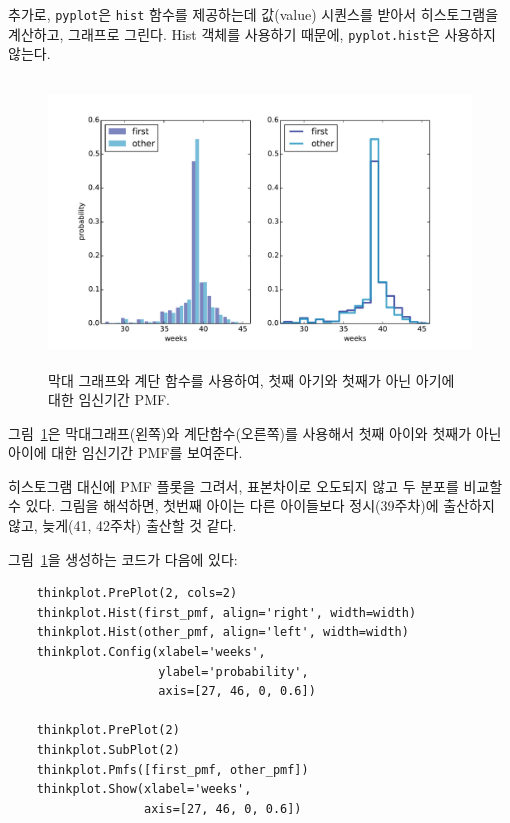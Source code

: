 추가로, {\tt pyplot}은 {\tt hist} 함수를 제공하는데 값(value) 시퀀스를 받아서
히스토그램을 계산하고, 그래프로 그린다.
Hist 객체를 사용하기 때문에, {\tt pyplot.hist}은 사용하지 않는다.

\begin{figure}
\centerline{\includegraphics[height=3.0in]{figs/probability_nsfg_pmf.pdf}}
\caption{막대 그래프와 계단 함수를 사용하여, 첫째 아기와 첫째가 아닌 아기에 대한 임신기간 PMF.}
\label{probability_nsfg_pmf}
\end{figure}

그림~\ref{probability_nsfg_pmf}은 막대그래프(왼쪽)와 계단함수(오른쪽)를 사용해서 첫째 아이와 첫째가 아닌 아이에 대한
임신기간 PMF를 보여준다.

히스토그램 대신에 PMF 플롯을 그려서, 표본차이로 오도되지 않고 두 분포를 비교할 수 있다.
그림을 해석하면, 첫번째 아이는 다른 아이들보다 정시(39주차)에 출산하지 않고, 늦게(41, 42주차) 출산할 것 같다.

그림~\ref{probability_nsfg_pmf}을 생성하는 코드가 다음에 있다:

\begin{verbatim}
    thinkplot.PrePlot(2, cols=2)
    thinkplot.Hist(first_pmf, align='right', width=width)
    thinkplot.Hist(other_pmf, align='left', width=width)
    thinkplot.Config(xlabel='weeks',
                     ylabel='probability',
                     axis=[27, 46, 0, 0.6])

    thinkplot.PrePlot(2)
    thinkplot.SubPlot(2)
    thinkplot.Pmfs([first_pmf, other_pmf])
    thinkplot.Show(xlabel='weeks',
                   axis=[27, 46, 0, 0.6])
\end{verbatim}

